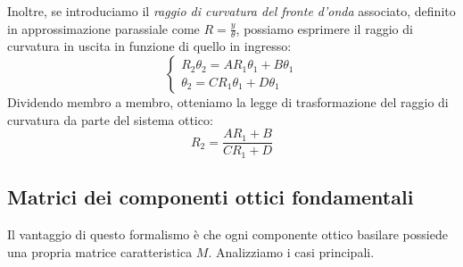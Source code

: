 \documentclass[openany,a4paper,12pt]{book}
\begin{document}
Inoltre, se introduciamo il \textit{raggio di curvatura del fronte d'onda} associato, definito in approssimazione parassiale come $R = \frac{y}{\theta}$, possiamo esprimere il raggio di curvatura in uscita in funzione di quello in ingresso:
\begin{equation}
    \begin{cases}
        R_2 \theta_2 = A R_1 \theta_1 + B \theta_1 \\
        \theta_2 = C R_1 \theta_1 + D \theta_1
    \end{cases}
\end{equation}
Dividendo membro a membro, otteniamo la legge di trasformazione del raggio di curvatura da parte del sistema ottico:
\begin{equation}
    R_2 = \frac{A R_1 + B}{C R_1 + D}
\end{equation}


\subsection*{Matrici dei componenti ottici fondamentali}
Il vantaggio di questo formalismo è che ogni componente ottico basilare possiede una propria matrice caratteristica $M$. Analizziamo i casi principali.
\end{document}
